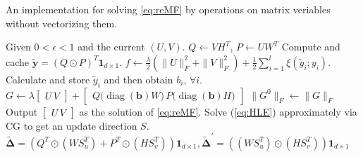 \documentclass[11pt,twoside]{article}
\newcommand{\bsym}[1]{\ensuremath{\boldsymbol{#1}}}
\newcommand{\pointprod}[2]{\ensuremath{\left( #1 \operatorname{\prescript{}{\cdot}{\ast}} #2 \right)}}
\DeclareMathOperator*{\diag}{diag}
\begin{document}
\clearpage\newpage
\begin{algorithm}
    \caption{An implementation for solving \eqref{eq:reMF} by operations on matrix veriables without vectorizing them.}
    \label{alg:LrFramework}
    \begin{algorithmic}[1]
        \State Given $0< \epsilon < 1$ and the current $(U,V)$.
        \State $Q \gets VH^T$, $P \gets UW^T$
        \State Compute and cache $\bsym{\tilde{y}}= (Q \odot P)^T\bsym{1}_{d\times 1}$.
        \State $f \gets \frac{\lambda}{2}(\|U\|_F^2 + \|V\|_F^2) + \frac{1}{2}\sum_{i=1}^l \xi(\tilde{y}_i;y_i)$.
            \State Calculate and store $\tilde{y}_i$ and then obtain $b_i$, $\forall i$.
            \State $G \gets \lambda \begin{bmatrix} U \, V \end{bmatrix} + \begin{bmatrix} Q \bigl(\diag(\bsym{b}) W \bigr) \, P \bigl ( \diag(\bsym{b}) H \bigr) \end{bmatrix}$
                \State $\|G^0\|_F \gets \|G\|_F$
            \EndIf
                \State Output $\begin{bmatrix} U \, V \end{bmatrix}$ as the solution of \eqref{eq:reMF}.
            \EndIf
            \State Solve (\ref{eq:HLE}) approximately via CG to get an update direction $S$.
            \State $\bsym{\tilde{\Delta}} = \left( Q^T \odot (WS_u^T)+ P^T\odot (HS_v^T) \right)\bsym{1}_{d\times 1}, \bsym{\tilde{\Delta}}^\prime = \left( (WS_u^T) \odot (HS_v^T) \right)\bsym{1}_{d\times 1}$

\end{algorithmic}
\end{algorithm}
\end{document}
